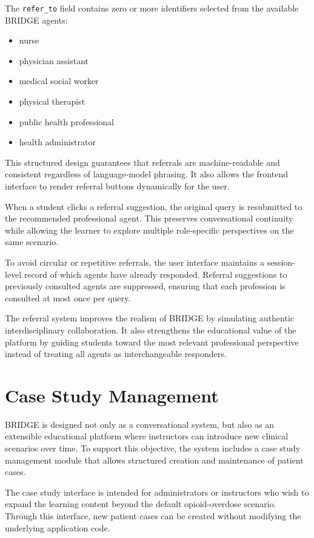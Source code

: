 \documentclass[12pt]{article}
\begin{document}
The \texttt{refer\_to} field contains zero or more identifiers selected from the available BRIDGE agents:

\begin{itemize}
    \item nurse
    \item physician assistant
    \item medical social worker
    \item physical therapist
    \item public health professional
    \item health administrator
\end{itemize}

This structured design guarantees that referrals are machine-readable and consistent regardless of language-model phrasing. It also allows the frontend interface to render referral buttons dynamically for the user.

When a student clicks a referral suggestion, the original query is resubmitted to the recommended professional agent. This preserves conversational continuity while allowing the learner to explore multiple role-specific perspectives on the same scenario.

To avoid circular or repetitive referrals, the user interface maintains a session-level record of which agents have already responded. Referral suggestions to previously consulted agents are suppressed, ensuring that each profession is consulted at most once per query.

The referral system improves the realism of BRIDGE by simulating authentic interdisciplinary collaboration. It also strengthens the educational value of the platform by guiding students toward the most relevant professional perspective instead of treating all agents as interchangeable responders.

\section{Case Study Management}

BRIDGE is designed not only as a conversational system, but also as an extensible educational platform where instructors can introduce new clinical scenarios over time. To support this objective, the system includes a case study management module that allows structured creation and maintenance of patient cases.

The case study interface is intended for administrators or instructors who wish to expand the learning content beyond the default opioid-overdose scenario. Through this interface, new patient cases can be created without modifying the underlying application code.
\end{document}
